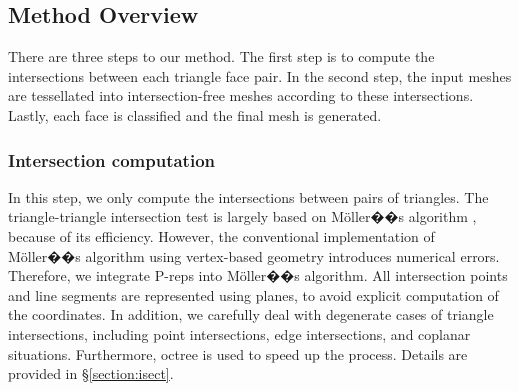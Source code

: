 \subsection{Method Overview}



There are three steps to our method. The first step is to compute the intersections between each triangle face pair. In the second step, the input meshes are tessellated into intersection-free meshes according to these intersections. Lastly, each face is classified and the final mesh is generated.

\subsubsection{Intersection computation}


In this step, we only compute the intersections between pairs of triangles. The triangle-triangle intersection test is largely based on M\"{o}ller��s algorithm \cite{moller1997fast}, because of its efficiency. However, the conventional implementation of M\"{o}ller��s algorithm using vertex-based geometry introduces numerical errors. Therefore, we integrate P-reps into M\"{o}ller��s algorithm. All intersection points and line segments are represented using planes, to avoid explicit computation of the coordinates. In addition, we carefully deal with degenerate cases of triangle intersections, including point intersections, edge intersections, and coplanar situations. Furthermore, octree is used to speed up the process. Details are provided in \S\ref{section:isect}.

